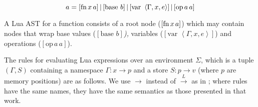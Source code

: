 \[
a=[\mbox{fn\,\ensuremath{x}\,\ensuremath{a}}]\,|\,[\mbox{base \ensuremath{b}}]\,|\,[\mbox{var }\left\langle \Gamma,x,e\right\rangle ]\,|\,[\mbox{op\,\ensuremath{a}\,\ensuremath{a}}]
\]


A Lua AST for a function consists of a root node ($[\mbox{fn\,\ensuremath{x}\,\ensuremath{a}}]$)
which may contain nodes that wrap base values\emph{ }($[\mbox{base }b]$\emph{),
}variables ($[\mbox{var }\left\langle \Gamma,x,e\right\rangle ]$)
and operations ($[\mbox{op}\, a\, a]$).

The rules for evaluating Lua expressions over an environment $\Sigma$,
which is a tuple $(\Gamma,S)$ containing a namespace $\Gamma:x\rightarrow p$
and a store $S:p\rightarrow v$ (where $p$ are memory positions)
are as follows. We use $\rightarrow$ instead of $\overset{L}{\rightarrow}$
as in \cite{DeVito2013Terra}; where rules have the same names, they have the
same semantics as those presented in that work.
